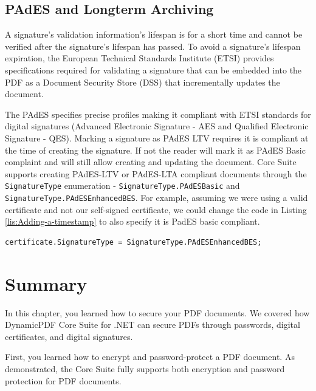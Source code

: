 \documentclass[american,letterpaper]{tufte-book}
\numberwithin{equation}{section}
\numberwithin{figure}{section}
\begin{document}
{\subsection{PAdES and Longterm Archiving}

A signature's validation information's lifespan is for a short time
and cannot be verified after the signature's lifespan has passed.
To avoid a signature's lifespan expiration, the European Technical
Standards Institute (ETSI) provides specifications required for validating
a signature that can be embedded into the PDF as a Document Security
Store (DSS) that incrementally updates the document.

The PAdES specifies precise profiles making it compliant with ETSI
standards for digital signatures (Advanced Electronic Signature -
AES and Qualified Electronic Signature - QES). Marking a signature
as PAdES LTV requires it is compliant at the time of creating the
signature. If not the reader will mark it as PAdES Basic complaint
and will still allow creating and updating the document. Core Suite
supports creating PAdES-LTV or PAdES-LTA compliant documents through
the \texttt{SignatureType} enumeration - \texttt{SignatureType.PAdESBasic}
and \texttt{SignatureType.PAdESEnhancedBES}. For example, assuming we were using a valid certificate and not our
self-signed certificate, we could change the code in Listing \ref{lis:Adding-a-timestamp}
to also specify it is PadES basic compliant.

\bgroup{}
\begin{lstlisting}[basicstyle={\small\ttfamily},breaklines=true]
certificate.SignatureType = SignatureType.PAdESEnhancedBES;
\end{lstlisting}
\leavevmode\egroup


\section{Summary}

In this chapter, you learned how to secure your PDF documents. We covered how DynamicPDF Core Suite for .NET can secure PDFs through passwords, digital certificates, and digital signatures.

First, you learned how to encrypt and password-protect a PDF document. As demonstrated, the Core Suite fully supports both encryption and password protection for PDF documents.

}
\end{document}
